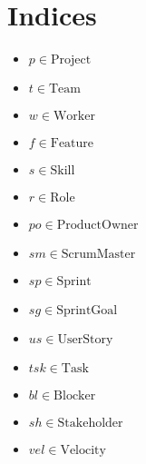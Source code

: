 \documentclass[11pt]{article}
\begin{document}
\section{Indices}
\begin{itemize}
    \item $p \in \text{Project}$
    \item $t \in \text{Team}$
    \item $w \in \text{Worker}$
    \item $f \in \text{Feature}$
    \item $s \in \text{Skill}$
    \item $r \in \text{Role}$
    \item $po \in \text{ProductOwner}$
    \item $sm \in \text{ScrumMaster}$
    \item $sp \in \text{Sprint}$
    \item $sg \in \text{SprintGoal}$
    \item $us \in \text{UserStory}$
    \item $tsk \in \text{Task}$
    \item $bl \in \text{Blocker}$
    \item $sh \in \text{Stakeholder}$
    \item $vel \in \text{Velocity}$
\end{itemize}
\end{document}
